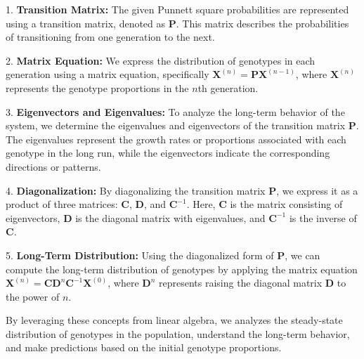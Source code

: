 \documentclass[a4paper,12pt]{article}
\begin{document}
1. \textbf{Transition Matrix:} The given Punnett square probabilities are represented using a transition matrix, denoted as $\mathbf{P}$. This matrix describes the probabilities of transitioning from one generation to the next.

2. \textbf{Matrix Equation:} We express the distribution of genotypes in each generation using a matrix equation, specifically $\mathbf{X}^{(n)} = \mathbf{P}\mathbf{X}^{(n-1)}$, where $\mathbf{X}^{(n)}$ represents the genotype proportions in the $n$th generation.

3. \textbf{Eigenvectors and Eigenvalues:} To analyze the long-term behavior of the system, we determine the eigenvalues and eigenvectors of the transition matrix $\mathbf{P}$. The eigenvalues represent the growth rates or proportions associated with each genotype in the long run, while the eigenvectors indicate the corresponding directions or patterns.

4. \textbf{Diagonalization:} By diagonalizing the transition matrix $\mathbf{P}$, we express it as a product of three matrices: $\mathbf{C}$, $\mathbf{D}$, and $\mathbf{C}^{-1}$. Here, $\mathbf{C}$ is the matrix consisting of eigenvectors, $\mathbf{D}$ is the diagonal matrix with eigenvalues, and $\mathbf{C}^{-1}$ is the inverse of $\mathbf{C}$.

5. \textbf{Long-Term Distribution:} Using the diagonalized form of $\mathbf{P}$, we can compute the long-term distribution of genotypes by applying the matrix equation $\mathbf{X}^{(n)} = \mathbf{C}\mathbf{D}^n\mathbf{C}^{-1}\mathbf{X}^{(0)}$, where $\mathbf{D}^n$ represents raising the diagonal matrix $\mathbf{D}$ to the power of $n$.

By leveraging these concepts from linear algebra, we analyzes the steady-state distribution of genotypes in the population, understand the long-term behavior, and make predictions based on the initial genotype proportions.
\end{document}
